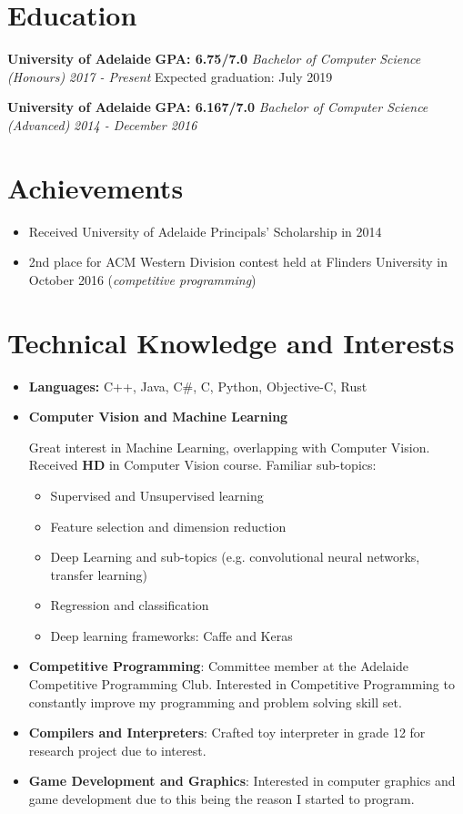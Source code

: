 \documentclass[10pt,oneside,a4paper]{article}
\newcommand{\ed}[5] 
{
    {
        \textbf{#1} \hfill {\footnotesize\textbf{#2}}\newline
        \emph{#3} \hfill \emph{#4}
    }
    {
        \newline
        {#5}
    }
}
\newcommand{\info}[2] 
{
    \section*{#1}
    \hrulefill
    \par{#2}
}
\begin{document}
\info{Education}
{
    \ed{University of Adelaide}{GPA: 6.75/7.0}
    {Bachelor of Computer Science (Honours)}{2017 - Present}
    {
    	Expected graduation: July 2019
    }
    \newline
    \newline
    \ed{University of Adelaide}{GPA: 6.167/7.0}
    {Bachelor of Computer Science (Advanced)}{2014 - December 2016}
    {
    }
}

\info{Achievements}
{
    \begin{itemize}[topsep=0pt,leftmargin=*]
        \item Received University of Adelaide Principals' Scholarship in 2014
        \item 2nd place for ACM Western Division contest held at Flinders University in October 2016 (\textit{competitive programming}) \\
    \end{itemize}
}

\info{Technical Knowledge and Interests}
{
    \begin{itemize}[topsep=0pt,leftmargin=*]
        \item[]
            \textbf{Languages:} C++, Java, C\#, C, Python, Objective-C, Rust

        \item[]
            \textbf{Computer Vision and Machine Learning}
            {
                Great interest in Machine Learning, overlapping with Computer Vision. Received \textbf{HD} in Computer Vision course. Familiar sub-topics:
                \begin{itemize}
                    \item Supervised and Unsupervised learning
                    \item Feature selection and dimension reduction
                    \item Deep Learning and sub-topics (e.g. convolutional neural networks, transfer learning)
                    \item Regression and classification
                    \item Deep learning frameworks: Caffe and Keras 
                \end{itemize}
            }
        \item[] 
            \textbf{Competitive Programming}: Committee member at the Adelaide Competitive Programming Club. Interested in Competitive Programming to constantly improve my programming and problem solving skill set. 
        \item[]
            \textbf{Compilers and Interpreters}: Crafted toy interpreter in grade 12 for research project due to interest.
        \item[]
            \textbf{Game Development and Graphics}: Interested in computer graphics and game development due to this being the reason I started to program.

    \end{itemize}
}
\end{document}

